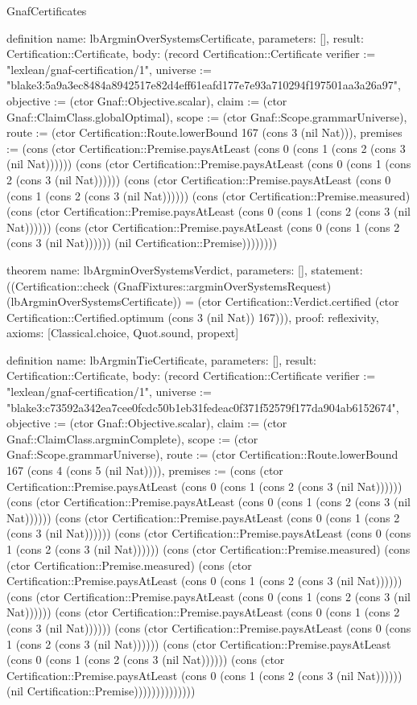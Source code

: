 \begin{lexlean}{GnafCertificates}
\begin{semanticmodule}
definition{
  name: lbArgminOverSystemsCertificate,
  parameters: [],
  result: Certification::Certificate,
  body: (record Certification::Certificate {verifier := "lexlean/gnaf-certification/1", universe := "blake3:5a9a3ec8484a8942517e82d4eff61eafd177e7e93a710294f197501aa3a26a97", objective := (ctor Gnaf::Objective.scalar), claim := (ctor Gnaf::ClaimClass.globalOptimal), scope := (ctor Gnaf::Scope.grammarUniverse), route := (ctor Certification::Route.lowerBound 167 (cons 3 (nil Nat))), premises := (cons (ctor Certification::Premise.paysAtLeast (cons 0 (cons 1 (cons 2 (cons 3 (nil Nat)))))) (cons (ctor Certification::Premise.paysAtLeast (cons 0 (cons 1 (cons 2 (cons 3 (nil Nat)))))) (cons (ctor Certification::Premise.paysAtLeast (cons 0 (cons 1 (cons 2 (cons 3 (nil Nat)))))) (cons (ctor Certification::Premise.measured) (cons (ctor Certification::Premise.paysAtLeast (cons 0 (cons 1 (cons 2 (cons 3 (nil Nat)))))) (cons (ctor Certification::Premise.paysAtLeast (cons 0 (cons 1 (cons 2 (cons 3 (nil Nat)))))) (nil Certification::Premise)))))))})
}

theorem{
  name: lbArgminOverSystemsVerdict,
  parameters: [],
  statement: ((Certification::check (GnafFixtures::argminOverSystemsRequest) (lbArgminOverSystemsCertificate)) = (ctor Certification::Verdict.certified (ctor Certification::Certified.optimum (cons 3 (nil Nat)) 167))),
  proof: reflexivity{},
  axioms: [Classical.choice, Quot.sound, propext]
}

definition{
  name: lbArgminTieCertificate,
  parameters: [],
  result: Certification::Certificate,
  body: (record Certification::Certificate {verifier := "lexlean/gnaf-certification/1", universe := "blake3:c73592a342ea7cee0fcdc50b1eb31fedeac0f371f52579f177da904ab6152674", objective := (ctor Gnaf::Objective.scalar), claim := (ctor Gnaf::ClaimClass.argminComplete), scope := (ctor Gnaf::Scope.grammarUniverse), route := (ctor Certification::Route.lowerBound 167 (cons 4 (cons 5 (nil Nat)))), premises := (cons (ctor Certification::Premise.paysAtLeast (cons 0 (cons 1 (cons 2 (cons 3 (nil Nat)))))) (cons (ctor Certification::Premise.paysAtLeast (cons 0 (cons 1 (cons 2 (cons 3 (nil Nat)))))) (cons (ctor Certification::Premise.paysAtLeast (cons 0 (cons 1 (cons 2 (cons 3 (nil Nat)))))) (cons (ctor Certification::Premise.paysAtLeast (cons 0 (cons 1 (cons 2 (cons 3 (nil Nat)))))) (cons (ctor Certification::Premise.measured) (cons (ctor Certification::Premise.measured) (cons (ctor Certification::Premise.paysAtLeast (cons 0 (cons 1 (cons 2 (cons 3 (nil Nat)))))) (cons (ctor Certification::Premise.paysAtLeast (cons 0 (cons 1 (cons 2 (cons 3 (nil Nat)))))) (cons (ctor Certification::Premise.paysAtLeast (cons 0 (cons 1 (cons 2 (cons 3 (nil Nat)))))) (cons (ctor Certification::Premise.paysAtLeast (cons 0 (cons 1 (cons 2 (cons 3 (nil Nat)))))) (cons (ctor Certification::Premise.paysAtLeast (cons 0 (cons 1 (cons 2 (cons 3 (nil Nat)))))) (cons (ctor Certification::Premise.paysAtLeast (cons 0 (cons 1 (cons 2 (cons 3 (nil Nat)))))) (nil Certification::Premise)))))))))))))})
}


\end{semanticmodule}
\end{lexlean}
